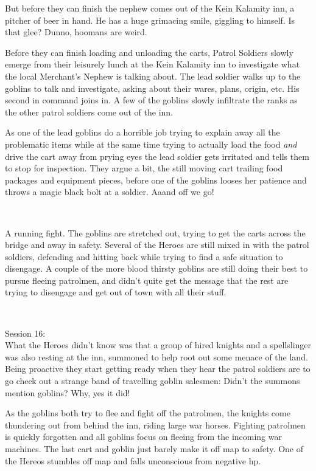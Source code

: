 \noindent But before they can finish the nephew comes out of the Kein Kalamity inn, a pitcher of beer in hand. He has a huge grimacing smile, giggling to himself. Is that glee? Dunno, hoomans are weird.

Before they can finish loading and unloading the carts, Patrol Soldiers slowly emerge from their leisurely lunch at the Kein Kalamity inn to investigate what the local Merchant's Nephew is talking about. The lead soldier walks up to the goblins to talk and investigate, asking about their wares, plans, origin, etc. His second in command joins in. A few of the goblins slowly infiltrate the ranks as the other patrol soldiers come out of the inn.

As one of the lead goblins do a horrible job trying to explain away all the problematic items while at the same time trying to actually load the food \emph{and} drive the cart away from prying eyes the lead soldier gets irritated and tells them to stop for inspection. They argue a bit, the still moving cart trailing food packages and equipment pieces, before one of the goblins looses her patience and throws a magic black bolt at a soldier. Aaand off we go!

\

A running fight. The goblins are stretched out, trying to get the carts across the bridge and away in safety. Several of the Heroes are still mixed in with the patrol soldiers, defending and hitting back while trying to find a safe situation to disengage. A couple of the more blood thirsty goblins are still doing their best to pursue fleeing patrolmen, and didn't quite get the message that the rest are trying to disengage and get out of town with all their stuff.

\

Session 16:\\                                                           %
What the Heroes didn't know was that a group of hired knights and a spellslinger was also resting at the inn, summoned to help root out some menace of the land. Being proactive they start getting ready when they hear the patrol soldiers are to go check out a strange band of travelling goblin salesmen: Didn't the summons mention goblins? Why, yes it did!

As the goblins both try to flee and fight off the patrolmen, the knights come thundering out from behind the inn, riding large war horses. Fighting patrolmen is quickly forgotten and all goblins focus on fleeing from the incoming war machines. The last cart and goblin just barely make it off map to safety. One of the Hereos stumbles off map and falls unconscious from negative hp.

